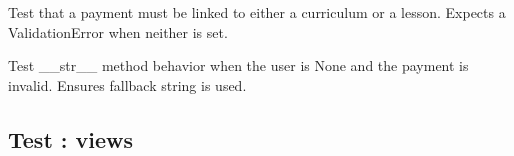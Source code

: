 \documentclass[letterpaper,10pt,english]{sphinxmanual}
\begin{document}
\begin{fulllineitems}
\label{\detokenize{payments.tests:payments.tests.test_models.test_payment_validation_error_neither_curriculum_nor_lesson}}
\pysigstartsignatures
\pysiglinewithargsret
{}
{}
{}
\pysigstopsignatures
\sphinxAtStartPar
Test that a payment must be linked to either a curriculum or a lesson.
Expects a ValidationError when neither is set.

\end{fulllineitems}


\begin{fulllineitems}
\label{\detokenize{payments.tests:payments.tests.test_models.test_str_unknown_user_and_invalid_payment}}
\pysigstartsignatures
\pysiglinewithargsret
{}
{}
{}
\pysigstopsignatures
\sphinxAtStartPar
Test \_\_str\_\_ method behavior when the user is None and the payment is invalid.
Ensures fallback string is used.

\end{fulllineitems}



\subsection{Test : views}
\label{\detokenize{payments.tests:module-payments.tests.test_views}}\label{\detokenize{payments.tests:test-views}}
\end{document}
